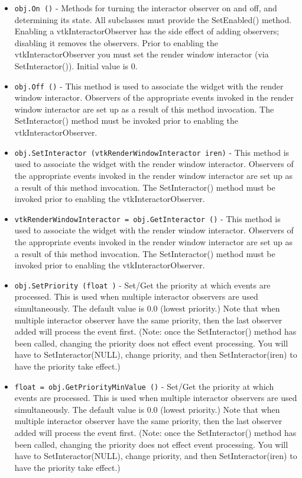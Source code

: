 \begin{itemize}
\item  \verb|obj.On ()| -  Methods for turning the interactor observer on and off, and determining
 its state. All subclasses must provide the SetEnabled() method.
 Enabling a vtkInteractorObserver has the side effect of adding
 observers; disabling it removes the observers. Prior to enabling the
 vtkInteractorObserver you must set the render window interactor (via
 SetInteractor()). Initial value is 0.

\item  \verb|obj.Off ()| -  This method is used to associate the widget with the render window
 interactor.  Observers of the appropriate events invoked in the render
 window interactor are set up as a result of this method invocation.
 The SetInteractor() method must be invoked prior to enabling the
 vtkInteractorObserver.

\item  \verb|obj.SetInteractor (vtkRenderWindowInteractor iren)| -  This method is used to associate the widget with the render window
 interactor.  Observers of the appropriate events invoked in the render
 window interactor are set up as a result of this method invocation.
 The SetInteractor() method must be invoked prior to enabling the
 vtkInteractorObserver.

\item  \verb|vtkRenderWindowInteractor = obj.GetInteractor ()| -  This method is used to associate the widget with the render window
 interactor.  Observers of the appropriate events invoked in the render
 window interactor are set up as a result of this method invocation.
 The SetInteractor() method must be invoked prior to enabling the
 vtkInteractorObserver.

\item  \verb|obj.SetPriority (float )| -  Set/Get the priority at which events are processed. This is used when
 multiple interactor observers are used simultaneously. The default value
 is 0.0 (lowest priority.) Note that when multiple interactor observer
 have the same priority, then the last observer added will process the
 event first. (Note: once the SetInteractor() method has been called,
 changing the priority does not effect event processing. You will have
 to SetInteractor(NULL), change priority, and then SetInteractor(iren)
 to have the priority take effect.)

\item  \verb|float = obj.GetPriorityMinValue ()| -  Set/Get the priority at which events are processed. This is used when
 multiple interactor observers are used simultaneously. The default value
 is 0.0 (lowest priority.) Note that when multiple interactor observer
 have the same priority, then the last observer added will process the
 event first. (Note: once the SetInteractor() method has been called,
 changing the priority does not effect event processing. You will have
 to SetInteractor(NULL), change priority, and then SetInteractor(iren)
 to have the priority take effect.)


\end{itemize}

